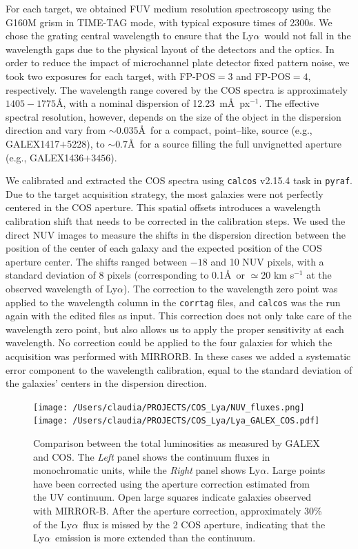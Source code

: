 \documentclass[manuscript]{emulateapj}
\newcommand{\lya}{Ly$\alpha$}
\begin{document}
For each target, we obtained FUV medium resolution spectroscopy using the G160M grism in 
TIME-TAG mode, with typical exposure times of 2300s. We chose the grating central wavelength to ensure
that the \lya\ would not fall in the wavelength gaps due to the
physical layout of the detectors and the optics. In order to reduce
the impact of microchannel plate detector fixed pattern noise, we took
two exposures for each target, with FP-POS$=3$ and FP-POS$=4$,
respectively. The wavelength range covered by the COS spectra is
approximately $1405-1775$\AA, with a nominal dispersion of 12.23~m\AA\
px$^{-1}$. The effective spectral resolution, however, depends on the size of the object in the dispersion direction and vary from $\sim 0.035$\AA\ for a compact, point--like, source (e.g., GALEX1417$+$5228), 
to $\sim 0.7$\AA\ for a source filling the full unvignetted aperture (e.g., GALEX1436$+3456$).
                        
We calibrated and extracted the COS spectra using {\tt calcos}
v2.15.4 task in {\tt pyraf}. Due to the target acquisition strategy, the
most galaxies were not perfectly centered in the COS aperture. This spatial offsets introduces a 
wavelength calibration shift that needs to be corrected in the calibration steps.  
We used the direct NUV images to measure the shifts in the dispersion direction
between the position of the center of each galaxy and the expected
position of the COS aperture center. The shifts ranged between $-18$
and 10 NUV pixels, with a standard deviation of 8 pixels
(corresponding to 0.1\AA\ or $\simeq$20 km s$^{-1}$ at the observed wavelength of \lya). 
The correction to the wavelength zero point was applied to the wavelength column in the {\tt corrtag} files,
and {\tt calcos} was the run again with the edited files as
input. This correction does not only take care of the wavelength zero
point, but also allows us to apply the proper sensitivity at each
wavelength. No correction could be applied to the four galaxies for which the acquisition was performed with MIRRORB. In these cases we added a systematic error component to the
wavelength calibration, equal to the standard deviation of the
galaxies' centers in the dispersion direction.


\begin{figure}[t!]
  \centering
  \texttt{[image: /Users/claudia/PROJECTS/COS\_Lya/NUV\_fluxes.png]}
  \texttt{[image: /Users/claudia/PROJECTS/COS\_Lya/Lya\_GALEX\_COS.pdf]}
  \caption{Comparison between the total luminosities as measured by GALEX 
	and COS. The \emph{Left} panel shows the continuum fluxes in monochromatic
	units, while the \emph{Right} panel shows \lya. Large
    points have been corrected using the aperture correction estimated
    from the UV continuum. Open large squares indicate galaxies
    observed with MIRROR-B. After the aperture correction,
    approximately 30\% of the \lya\ flux is missed by the 2 COS
    aperture, indicating that the \lya\ emission is more extended than
    the continuum.}
  \label{fig:GALEX_COSflux}
\end{figure}
\end{document}
